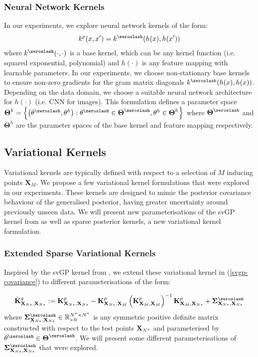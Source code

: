 \documentclass{article}
\numberwithin{equation}{section}
\begin{document}
\subsubsection{Neural Network Kernels}
In our experiments, we explore neural network kernels of the form:
\begin{align}
    k^p(x, x') = k^{\zeroslash}(h(x), h(x'))
\end{align}
where $k^{\zeroslash}(\cdot, \cdot)$ is a base kernel, which can be any kernel function (i.e. squared exponential, polynomial) and $h(\cdot)$ is any feature mapping with learnable parameters. In our experiments, we choose non-stationary base kernels to ensure non-zero gradients for the gram matrix diagonals $k^{\zeroslash}(h(x), h(x))$. Depending on the data domain, we choose a suitable neural network architecture for $h(\cdot)$ (i.e. CNN for images). This formulation defines a parameter space $\boldsymbol{\Theta}^k = \left\{\left(\theta^{\zeroslash}, \theta^h\right):  \theta^{\zeroslash} \in \boldsymbol{\Theta}^{\zeroslash}, \theta^h \in \boldsymbol{\Theta}^h\right\}$ where $\boldsymbol{\Theta}^{\zeroslash}$ and $\boldsymbol{\Theta}^h$ are the parameter spaces of the base kernel and feature mapping respectively.

\subsection{Variational Kernels}
Variational kernels are typically defined with respect to a selection of $M$ inducing points $\mathbf{X}_M$. We propose a few variational kernel formulations that were explored in our experiments. These kernels are designed to mimic the posterior covariance behaviour of the generalised posterior, having greater uncertainty around previously unseen data. We will present new parameterisations of the svGP kernel from \cite{titsias2009variational} as well as sparse posterior kernels, a new variational kernel formulation.

\subsubsection{Extended Sparse Variational Kernels}
Inspired by the svGP kernel from \cite{titsias2009variational}, we extend these variational kernel in (\ref{svgp-covariance}) to different parameterisations of the form:

\begin{align}
            \bar{\mathbf{K}}^q_{\mathbf{X}_{N*}, \mathbf{X}_{N*}} := \mathbf{K}^p_{\mathbf{X}_{N*}, \mathbf{X}_{N*}} - \mathbf{K}^p_{\mathbf{X}_{N*}, \mathbf{X}_M}\left(\mathbf{K}^p_{\mathbf{X}_{M}, \mathbf{X}_M}\right)^{-1}\mathbf{K}^p_{\mathbf{X}_M, \mathbf{X}_{N*}} + \mathbf{\Sigma}^{\zeroslash}_{\mathbf{X}_{N*}, \mathbf{X}_{N*}}
\end{align}
where $\mathbf{\Sigma}^{\zeroslash}_{\mathbf{X}_{N*}, \mathbf{X}_{N*}} \in \mathbb{R}^{N^*\times N^*}_{\succ 0}$ is any symmetric positive definite matrix constructed with respect to the test points $\mathbf{X}_{N*}$ and parameterised by $\theta^{\zeroslash} \in \boldsymbol{\Theta}^{\zeroslash}$. We will present some different parameterisations of $\mathbf{\Sigma}^{\zeroslash}_{\mathbf{X}_{N*}, \mathbf{X}_{N*}}$ that were explored.
\end{document}
